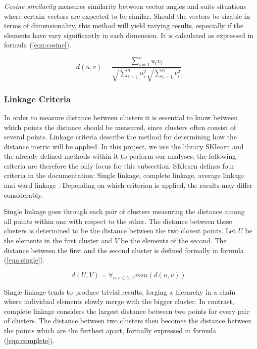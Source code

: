 \textit{Cosine similarity} measures similarity between vector angles and suits situations where certain vectors are expected to be similar. Should the vectors be sizable in terms of dimensionality, this method will yield varying results, especially if the elements have vary significantly in each dimension. It is calculated as expressed in formula (\ref{eqn:cosine}).

\begin{equation}
\label{eqn:cosine}
d(u, v) = \frac{\sum_{i=1}^n u_iv_i}{\sqrt{\sum_{i=1}^n u_i^2}\sqrt{\sum_{i=1}^n v_i^2}}
\end{equation}

\subsubsection{Linkage Criteria}
In order to measure distance between clusters it is essential to know between which points the distance should be measured, since clusters often consist of several points. Linkage criteria describe the method for determining how the distance metric will be applied. In this project, we use the library SKlearn and the already defined methods within it to perform our analyses; the following criteria are therefore the only focus for this subsection. SKlearn defines four criteria in the documentation: Single linkage, complete linkage, average linkage and ward linkage \cite{scikit}. Depending on which criterion is applied, the results may differ considerably.

Single linkage goes through each pair of clusters measuring the distance among all points within one with respect to the other. The distance between these clusters is determined to be the distance between the two closest points. Let $U$ be the elements in the first cluster and $V$ be the elements of the second. The distance between the first and the second cluster is defined formally in formula (\ref{eqn:single}).

\begin{equation}
\label{eqn:single}
d(U, V) = \forall_{u, v \in U, V} min(d(u, v))
\end{equation}

Single linkage tends to produce trivial results, forging a hierarchy in a chain where individual elements slowly merge with the bigger cluster. In contrast, complete linkage considers the largest distance between two points for every pair of clusters. The distance between two clusters then becomes the distance between the points which are the furthest apart, formally expressed in formula (\ref{eqn:complete}).

